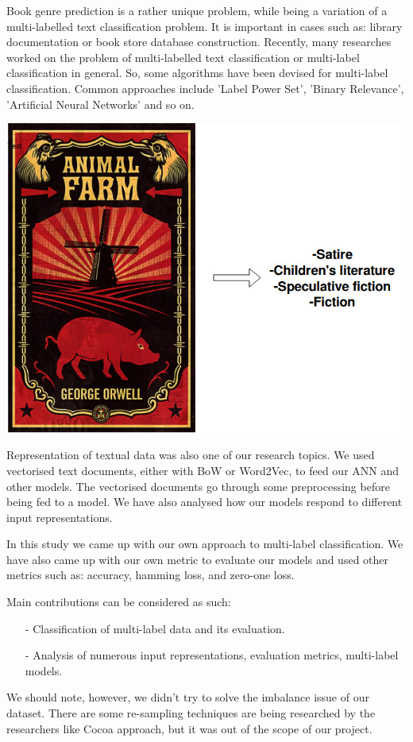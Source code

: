 \documentclass[10pt,twocolumn,letterpaper]{article}
\begin{document}
Book genre prediction is a rather unique problem, while being a variation of a multi-labelled text classification problem. It is important in cases such as: library documentation or book store database construction. Recently, many researches worked on the problem of multi-labelled text classification or multi-label classification in general. So, some algorithms have been devised for multi-label classification. Common approaches include 'Label Power Set', 'Binary Relevance', 'Artificial Neural Networks' and so on.

\includegraphics[width=0.8\linewidth]{Book}

Representation of textual data was also one of our research topics. We used vectorised text documents, either with BoW or Word2Vec, to feed our ANN and other models. The vectorised documents go through some preprocessing before being fed to a model. We have also analysed how our models respond to different input representations.

In this study we came up with our own approach to multi-label classification. We have also came up with our own metric to evaluate our models and used other metrics such as: accuracy, hamming loss, and zero-one loss.

Main contributions can be considered as such:
\begin{itemize}
\item[-] Classification of multi-label data and its evaluation.
\item[-] Analysis of numerous input representations, evaluation metrics, multi-label models.
\end{itemize}

We should note, however, we didn't try to solve the imbalance issue of our dataset. There are some re-sampling techniques are being researched by the researchers like Cocoa approach, but it was out of the scope of our project.\\
\end{document}
